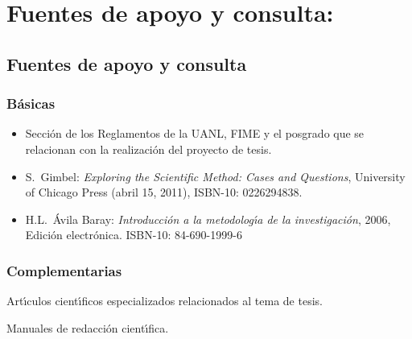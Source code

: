 \section{Fuentes de apoyo y consulta:}

\subsection{Fuentes de apoyo y consulta}

\subsubsection{B\'{a}sicas}

\begin{itemize}[itemsep=0em]
  
\item{Secci\'{o}n de los Reglamentos de la UANL, FIME y el posgrado
    que se relacionan con la realizaci\'{o}n del proyecto de tesis.}
  
\item{S.\ {\sc Gimbel}: {\em Exploring the Scientific Method: Cases
      and Questions}, University of Chicago Press (abril 15, 2011),
    ISBN-10: 0226294838.}
  
\item{ H.L.\ {\sc \'{A}vila Baray}: {\em Introducci\'{o}n a la
      metodolog\'{\i}a de la investigaci\'{o}n}, 2006, Edici\'{o}n
    electr\'{o}nica. ISBN-10: 84-690-1999-6}
  
\end{itemize}

\subsubsection{Complementarias}

Art\'{\i}culos cient\'{\i}ficos especializados relacionados al tema de
tesis.

Manuales de redacci\'{o}n cient\'{\i}fica.
